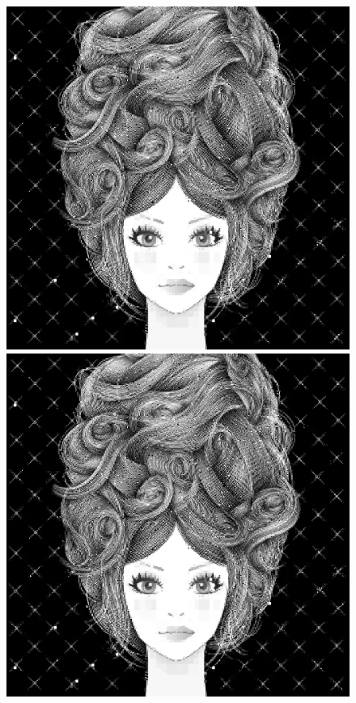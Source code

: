 \documentclass[11pt,a4paper,appendixprefix=true,numbers=noenddot]{scrreprt}
\begin{document}
\begin{figure}[!ht]
\includegraphics[scale=0.35]{images/girl09}
\includegraphics[scale=0.35]{images/girl10}

\end{figure}
\end{document}
